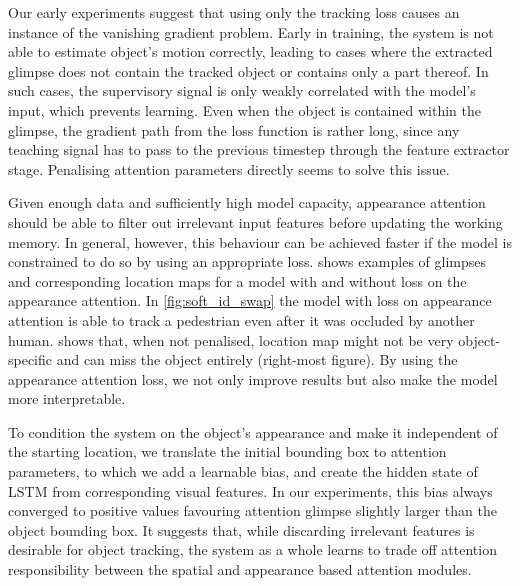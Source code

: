     \begin{description}[leftmargin=\parindent]
        \item[Spatial Attention Loss prevents Vanishing Gradients]        
        Our early experiments suggest that using only the tracking loss causes an instance of the vanishing gradient problem. Early in training, the system is not able to estimate object's motion correctly, leading to cases where the extracted glimpse does not contain the tracked object or contains only a part thereof. In such cases, the supervisory signal is only weakly correlated with the model's input, which prevents learning. Even when the object is contained within the glimpse, the gradient path from the loss function is rather long, since any teaching signal has to pass to the previous timestep through the feature extractor stage. Penalising attention parameters directly seems to solve this issue.
        
        \item[Is Appearance Attention Loss Necessary?]
        Given enough data and sufficiently high model capacity, appearance attention should be able to filter out irrelevant input features before updating the working memory. In general, however, this behaviour can be achieved faster if the model is constrained to do so by using an appropriate loss.  shows examples of glimpses and corresponding location maps for a model with and without loss on the appearance attention. In \cref{fig:soft_id_swap} the model with loss on appearance attention is able to track a pedestrian even after it was occluded by another human.  shows that, when not penalised, location map might not be very object-specific and can miss the object entirely (right-most figure). By using the appearance attention loss, we not only improve results but also make the model more interpretable.
    
        \item[Spatial Attention Bias is Always Positive]
        To condition the system on the object's appearance and make it independent of the starting location, we translate the initial bounding box to attention parameters, to which we add a learnable bias, and create the hidden state of LSTM from corresponding visual features. In our experiments, this bias always converged to positive values favouring attention glimpse slightly larger than the object bounding box. It suggests that, while discarding irrelevant features is desirable for object tracking, the system as a whole learns to trade off attention responsibility between the spatial and appearance based attention modules.
        
        
    \end{description}
